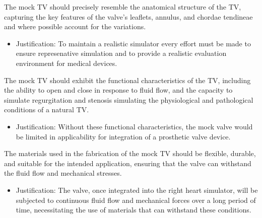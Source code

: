  The mock \gls{TV} should precisely resemble the anatomical structure of the \gls{TV}, capturing the key features of the valve's leaflets, annulus, and chordae tendineae and where possible account for the variations.
\begin{itemize}
  \item Justification: To maintain a realistic simulator every effort must be made to ensure represenative simulation and to provide a realistic evaluation environment for medical devices.
\end{itemize}

 The mock \gls{TV} should exhibit the functional characteristics of the \gls{TV}, including the ability to open and close in response to fluid flow, and the capacity to simulate regurgitation and stenosis simulating the physiological and pathological conditions of a natural \gls{TV}.
\begin{itemize}
  \item Justification: Without these functional characteristics, the mock valve would be limited in applicability for integration of a prosthetic valve device.
\end{itemize}

 The materials used in the fabrication of the mock \gls{TV} should be flexible, durable, and suitable for the intended application, ensuring that the valve can withstand the fluid flow and mechanical stresses.
\begin{itemize}
  \item Justification: The valve, once integrated into the right heart simulator, will be subjected to continuous fluid flow and mechanical forces over a long period of time, necessitating the use of materials that can withstand these conditions.
\end{itemize}

